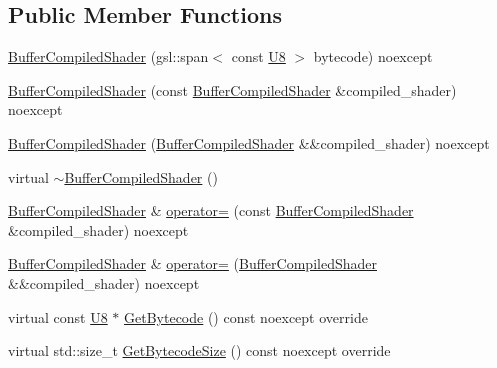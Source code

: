 \subsection*{Public Member Functions}
\begin{DoxyCompactItemize}
\item 
\mbox{\hyperlink{classmage_1_1rendering_1_1_buffer_compiled_shader_a104f1006017743ca041e123e8d4c3e6f}{Buffer\+Compiled\+Shader}} (gsl\+::span$<$ const \mbox{\hyperlink{namespacemage_a30677c03d683c4c35630c25f6ff3fb7f}{U8}} $>$ bytecode) noexcept
\item 
\mbox{\hyperlink{classmage_1_1rendering_1_1_buffer_compiled_shader_a81aeb002f1a4a11b93f70fbeb34c5afc}{Buffer\+Compiled\+Shader}} (const \mbox{\hyperlink{classmage_1_1rendering_1_1_buffer_compiled_shader}{Buffer\+Compiled\+Shader}} \&compiled\+\_\+shader) noexcept
\item 
\mbox{\hyperlink{classmage_1_1rendering_1_1_buffer_compiled_shader_a15ec170bf2864c9dcfa13dff93231a71}{Buffer\+Compiled\+Shader}} (\mbox{\hyperlink{classmage_1_1rendering_1_1_buffer_compiled_shader}{Buffer\+Compiled\+Shader}} \&\&compiled\+\_\+shader) noexcept
\item 
virtual \mbox{\hyperlink{classmage_1_1rendering_1_1_buffer_compiled_shader_af989fa0356f17de9dd75b76aace3f106}{$\sim$\+Buffer\+Compiled\+Shader}} ()
\item 
\mbox{\hyperlink{classmage_1_1rendering_1_1_buffer_compiled_shader}{Buffer\+Compiled\+Shader}} \& \mbox{\hyperlink{classmage_1_1rendering_1_1_buffer_compiled_shader_a1f8eb13198c5bad8ebe55ae1ddf94769}{operator=}} (const \mbox{\hyperlink{classmage_1_1rendering_1_1_buffer_compiled_shader}{Buffer\+Compiled\+Shader}} \&compiled\+\_\+shader) noexcept
\item 
\mbox{\hyperlink{classmage_1_1rendering_1_1_buffer_compiled_shader}{Buffer\+Compiled\+Shader}} \& \mbox{\hyperlink{classmage_1_1rendering_1_1_buffer_compiled_shader_a0e11565292a427dff5b36ef7c26b6d08}{operator=}} (\mbox{\hyperlink{classmage_1_1rendering_1_1_buffer_compiled_shader}{Buffer\+Compiled\+Shader}} \&\&compiled\+\_\+shader) noexcept
\item 
virtual const \mbox{\hyperlink{namespacemage_a30677c03d683c4c35630c25f6ff3fb7f}{U8}} $\ast$ \mbox{\hyperlink{classmage_1_1rendering_1_1_buffer_compiled_shader_aa19ad53b2761c07689476c3d77369b61}{Get\+Bytecode}} () const noexcept override
\item 
virtual std\+::size\+\_\+t \mbox{\hyperlink{classmage_1_1rendering_1_1_buffer_compiled_shader_a8c7815186d97444a5bcd009307ed8b9d}{Get\+Bytecode\+Size}} () const noexcept override
\end{DoxyCompactItemize}
